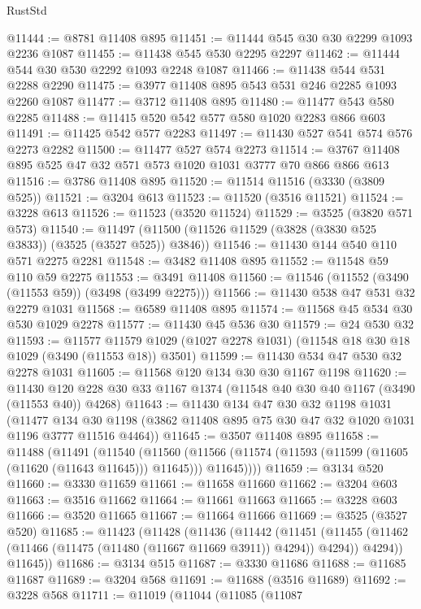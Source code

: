 \begin{lexlean}{RustStd}
\begin{coremodule}
{\begin{coremodule}
{{{{{{{{{{{{{{{{{{{{{{{{{{@11444 := @8781 @11408 @895
@11451 := @11444 @545 @30 @30 @2299 @1093 @2236 @1087
@11455 := @11438 @545 @530 @2295 @2297
@11462 := @11444 @544 @30 @530 @2292 @1093 @2248 @1087
@11466 := @11438 @544 @531 @2288 @2290
@11475 := @3977 @11408 @895 @543 @531 @246 @2285 @1093 @2260 @1087
@11477 := @3712 @11408 @895
@11480 := @11477 @543 @580 @2285
@11488 := @11415 @520 @542 @577 @580 @1020 @2283 @866 @603
@11491 := @11425 @542 @577 @2283
@11497 := @11430 @527 @541 @574 @576 @2273 @2282
@11500 := @11477 @527 @574 @2273
@11514 := @3767 @11408 @895 @525 @47 @32 @571 @573 @1020 @1031 @3777 @70 @866 @866 @613
@11516 := @3786 @11408 @895
@11520 := @11514 @11516 (@3330 (@3809 @525))
@11521 := @3204 @613
@11523 := @11520 (@3516 @11521)
@11524 := @3228 @613
@11526 := @11523 (@3520 @11524)
@11529 := @3525 (@3820 @571 @573)
@11540 := @11497 (@11500 (@11526 @11529 (@3828 (@3830 @525 @3833)) (@3525 (@3527 @525)) @3846))
@11546 := @11430 @144 @540 @110 @571 @2275 @2281
@11548 := @3482 @11408 @895
@11552 := @11548 @59 @110 @59 @2275
@11553 := @3491 @11408
@11560 := @11546 (@11552 (@3490 (@11553 @59)) (@3498 (@3499 @2275)))
@11566 := @11430 @538 @47 @531 @32 @2279 @1031
@11568 := @6589 @11408 @895
@11574 := @11568 @45 @534 @30 @530 @1029 @2278
@11577 := @11430 @45 @536 @30
@11579 := @24 @530 @32
@11593 := @11577
    @11579
    @1029
    (@1027 @2278 @1031)
    (@11548 @18 @30 @18 @1029 (@3490 (@11553 @18)) @3501)
@11599 := @11430 @534 @47 @530 @32 @2278 @1031
@11605 := @11568 @120 @134 @30 @30 @1167 @1198
@11620 := @11430 @120 @228 @30 @33 @1167 @1374 (@11548 @40 @30 @40 @1167 (@3490 (@11553 @40)) @4268)
@11643 := @11430
    @134
    @47
    @30
    @32
    @1198
    @1031
    (@11477 @134 @30 @1198 (@3862 @11408 @895 @75 @30 @47 @32 @1020 @1031 @1196 @3777 @11516 @4464))
@11645 := @3507 @11408 @895
@11658 := @11488
    (@11491
      (@11540
        (@11560
          (@11566 (@11574 (@11593 (@11599 (@11605 (@11620 (@11643 @11645))) @11645))) @11645))))
@11659 := @3134 @520
@11660 := @3330 @11659
@11661 := @11658 @11660
@11662 := @3204 @603
@11663 := @3516 @11662
@11664 := @11661 @11663
@11665 := @3228 @603
@11666 := @3520 @11665
@11667 := @11664 @11666
@11669 := @3525 (@3527 @520)
@11685 := @11423
    (@11428
      (@11436
        (@11442
          (@11451
            (@11455 (@11462 (@11466 (@11475 (@11480 (@11667 @11669 @3911)) @4294)) @4294))
            @4294))
        @11645))
@11686 := @3134 @515
@11687 := @3330 @11686
@11688 := @11685 @11687
@11689 := @3204 @568
@11691 := @11688 (@3516 @11689)
@11692 := @3228 @568
@11711 := @11019
    (@11044
      (@11085
        (@11087
}}}}}}}}}}}}}}}}}}}}}}}}}}
\end{coremodule}}
\end{coremodule}
\end{lexlean}
